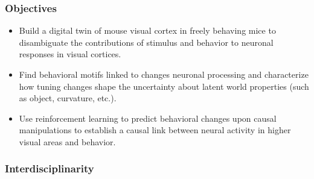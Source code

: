 \documentclass[COG,11pt]{ercgrant}
\begin{document}
\subsubsection{Objectives}
\begin{itemize}[leftmargin=2em,topsep=0pt,itemsep=0.62ex,partopsep=0ex,parsep=0.5ex,rightmargin=1ex]
    \item[\obj{1}] Build a digital twin of mouse visual cortex in freely behaving mice to disambiguate the contributions of stimulus and behavior to neuronal responses in visual cortices.
    \item[\obj{2}] Find behavioral motifs linked to changes neuronal processing and characterize how tuning changes shape the uncertainty about latent world properties (such as object, curvature, etc.).
    \item[\obj{3}] Use reinforcement learning to predict behavioral changes upon causal manipulations to establish a causal link between neural activity in higher visual areas and behavior. 
\end{itemize}


\subsubsection{Interdisciplinarity}
\end{document}
